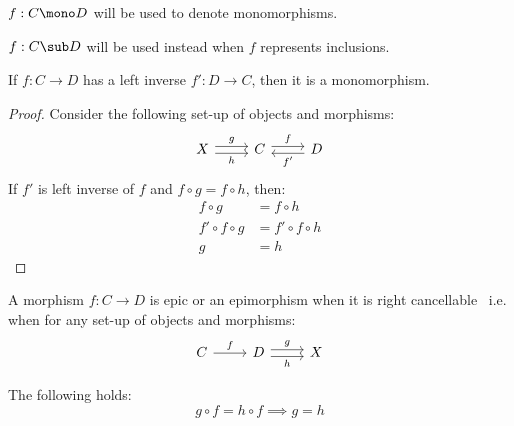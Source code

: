 \begin{remark}
  $f:C\mono D$ will be used to denote monomorphisms.
\end{remark}

\begin{remark}
  $f:C\sub D$ will be used instead when $f$ represents inclusions.
\end{remark}

\begin{theorem}\label{thm:left_inverse_implies_mono}

  If $f:C\to D$ has a left inverse $f':D\to C$, then it is a monomorphism.

  \begin{proof}
    Consider the following set-up of objects and morphisms:
    \[\begin{tikzcd}[ampersand replacement=\&]
      X \& C \& D
      \arrow["f", shift left=1, from=1-2, to=1-3]
      \arrow["g", shift left=1, from=1-1, to=1-2]
      \arrow["h"', shift right=1, from=1-1, to=1-2]
      \arrow["{f'}", shift left=1, from=1-3, to=1-2]
    \end{tikzcd}\]
    If $f'$ is left inverse of $f$ and $f\circ g = f\circ h$, then:
    \[
      \begin{aligned}
        f\circ g &= f\circ h\\
        f'\circ f \circ g &= f'\circ f\circ h\\
        g &= h
      \end{aligned}
    \]
  \end{proof}
  \vspace{-1.5\baselineskip}
\end{theorem}

\begin{definition}[Epimorphism]
  A morphism $f:C\to D$ is epic or an epimorphism when it is right
  cancellable~\parencite[p.~19]{lane:working_mathematician} i.e. when for any
  set-up of objects and morphisms:
  \[\begin{tikzcd}[ampersand replacement=\&]
    C \& D \& X
    \arrow["h"', shift right=1, from=1-2, to=1-3]
    \arrow["f", from=1-1, to=1-2]
    \arrow["g", shift left=1, from=1-2, to=1-3]
  \end{tikzcd}\]

  The following holds:
  \[g \circ f = h \circ f \implies g = h\]
\end{definition}

